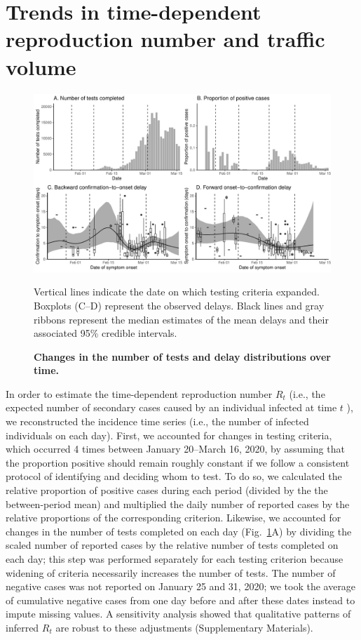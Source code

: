 \documentclass[12pt]{article}
\newcommand{\fref}[1]{Fig.~\ref{fig:#1}}
\begin{document}

\section{Trends in time-dependent reproduction number and traffic volume}

\begin{figure}[!ht]
\includegraphics[width=\textwidth]{figure_report_delay.pdf}
\caption{
\textbf{Changes in the number of tests and delay distributions over time.}
}
Vertical lines indicate the date on which testing criteria expanded.
Boxplots (C--D) represent the observed delays.
Black lines and gray ribbons represent the median estimates of the mean delays and their associated 95\% credible intervals.
\label{fig:dist}
\end{figure}

In order to estimate the time-dependent reproduction number $R_t$ (i.e., the expected number of secondary cases caused by an individual infected at time $t$ \citep{fraser2007estimating}), we reconstructed the incidence time series (i.e., the number of infected individuals on each day).
First, we accounted for changes in testing criteria, which occurred 4 times between January 20--March 16, 2020, by assuming that the proportion positive should remain roughly constant if we follow a consistent protocol of identifying and deciding whom to test.
To do so, we calculated the relative proportion of positive cases during each period (divided by the the between-period mean) and multiplied the daily number of reported cases by the relative proportions of the corresponding criterion.
Likewise, we accounted for changes in the number of tests completed on each day (\fref{dist}A) by dividing the scaled number of reported cases by the relative number of tests completed on each day; this step was performed separately for each testing criterion because widening of criteria necessarily increases the number of tests.
The number of negative cases was not reported on January 25 and 31, 2020; we took the average of cumulative negative cases from one day before and after these dates instead to impute missing values.
A sensitivity analysis showed that qualitative patterns of inferred $R_t$ are robust to these adjustments (Supplementary Materials).
\end{document}
